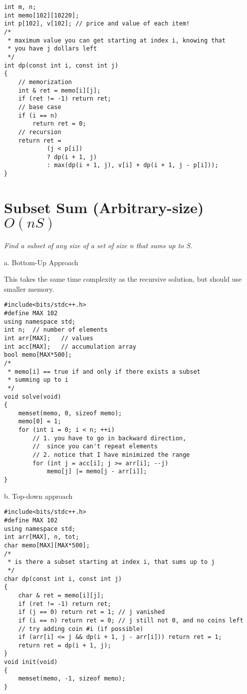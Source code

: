 \documentclass[12pt]{book}
\begin{document}
\begin{verbatim}
int m, n;
int memo[102][10220];
int p[102], v[102];	// price and value of each item!
/*
 * maximum value you can get starting at index i, knowing that
 * you have j dollars left
 */
int dp(const int i, const int j)
{
	// memorization
	int & ret = memo[i][j];
	if (ret != -1) return ret;
	// base case
	if (i == n)
		return ret = 0;
	// recursion
	return ret =
			(j < p[i])
			? dp(i + 1, j)
			: max(dp(i + 1, j), v[i] + dp(i + 1, j - p[i]));
}
\end{verbatim}
\section{Subset Sum (Arbitrary-size) $O(nS)$}
\textit{Find a subset of any size of a set of size n that sums up to S.}

a. Bottom-Up Approach

This takes the same time complexity as the recursive solution, but should use smaller memory.
\begin{verbatim}
#include<bits/stdc++.h>
#define MAX 102
using namespace std;
int n;	// number of elements
int arr[MAX];	// values
int acc[MAX];	// accumulation array
bool memo[MAX*500];
/*
 * memo[i] == true if and only if there exists a subset
 * summing up to i
 */
void solve(void)
{
	memset(memo, 0, sizeof memo);
	memo[0] = 1;
	for (int i = 0; i < n; ++i)
		// 1. you have to go in backward direction,
		// 	since you can't repeat elements
		// 2. notice that I have minimized the range
		for (int j = acc[i]; j >= arr[i]; --j)
			memo[j] |= memo[j - arr[i]];
}
\end{verbatim}

b. Top-down approach
\begin{verbatim}
#include<bits/stdc++.h>
#define MAX 102
using namespace std;
int arr[MAX], n, tot;
char memo[MAX][MAX*500];
/*
 * is there a subset starting at index i, that sums up to j
 */
char dp(const int i, const int j)
{
	char & ret = memo[i][j];
	if (ret != -1) return ret;
	if (j == 0) return ret = 1;	// j vanished
	if (i == n) return ret = 0;	// j still not 0, and no coins left
	// try adding coin #i (if possible)
	if (arr[i] <= j && dp(i + 1, j - arr[i])) return ret = 1;
	return ret = dp(i + 1, j);
}
void init(void)
{
	memset(memo, -1, sizeof memo);
}
\end{verbatim}
\end{document}
